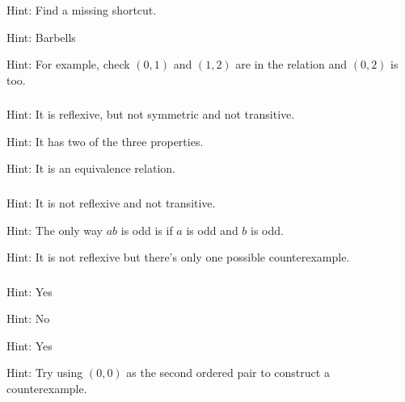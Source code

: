 \subsubsection*{ \answers}
\begin{apart}
    \item Hint: Find a missing shortcut.
    \item Hint: Barbells
    \item Hint: For example, check $(0,1)$ and $(1,2)$ are in the relation and $(0,2)$ is too.
\end{apart}

\subsubsection*{ \answers}
\begin{apart}
    \item Hint: It is reflexive, but not symmetric and not transitive.
    \item Hint: It has two of the three properties.
    \item Hint: It is an equivalence relation.
\end{apart}

\subsubsection*{ \answers}
\begin{apart}
    \item Hint: It is not reflexive and not transitive.
    \item Hint: The only way $ab$ is odd is if $a$ is odd and $b$ is odd.
    \item Hint: It is not reflexive but there's only one possible counterexample.
\end{apart}

\subsubsection*{ \answers}
\begin{apart}
    \item Hint: Yes
    \item Hint: No
    \item Hint: Yes
    \item Hint: Try using $(0,0)$ as the second ordered pair to construct a counterexample.
\end{apart}

